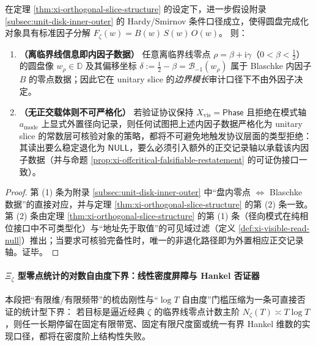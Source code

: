 \begin{corollary}[内因子数据的正交寄存器必要性]\label{cor:xi-inner-factor-orthogonal-register}
在定理 \ref{thm:xi-orthogonal-slice-structure} 的设定下，进一步假设附录 \ref{subsec:unit-disk-inner-outer} 的 Hardy/Smirnov 条件口径成立，使得圆盘完成化对象具有标准因子分解
\(
F_\zeta(w)=B(w)\,S(w)\,O(w)
\)。
则：
\begin{enumerate}
  \item \textbf{（离临界线信息即内因子数据）}
  任意离临界线零点 \(\rho=\beta+\mathrm{i}\gamma\)（\(0<\beta<\tfrac12\)）的圆盘像 \(w_\rho\in\mathbb{D}\) 及其偏移坐标
  \(
  \delta:=\tfrac12-\beta=\mathcal{B}_{-1}(w_\rho)
  \)
  属于 Blaschke 内因子 \(B\) 的零点数据；因此它在 unitary slice 的\emph{边界模长}审计口径下不由外因子决定。
  \item \textbf{（无正交载体则不可严格化）}
  若验证协议保持 \(X_{\mathrm{vis}}=\mathsf{Phase}\) 且拒绝在模式轴 \(a_{\mathrm{mode}}\) 上显式外置径向记录，则任何试图把上述内因子数据严格化为 unitary slice 的常数层可核验对象的策略，都将不可避免地触发协议层面的类型拒绝：其读出要么稳定退化为 \(\mathsf{NULL}\)，要么必须引入额外的正交记录轴以承载该内因子数据（并与命题 \ref{prop:xi-offcritical-falsifiable-restatement} 的可证伪接口一致）。
\end{enumerate}
\end{corollary}

\begin{proof}
第 (1) 条为附录 \ref{subsec:unit-disk-inner-outer} 中“盘内零点 \(\Leftrightarrow\) Blaschke 数据”的直接对应，并与定理 \ref{thm:xi-orthogonal-slice-structure} 的第 (2) 条一致。
第 (2) 条由定理 \ref{thm:xi-orthogonal-slice-structure} 的第 (1) 条（径向模式在纯相位接口中不可类型化）与“地址先于取值”的可见域过滤（定义 \ref{def:xi-visible-read-null}）推出；当要求可核验完备性时，唯一的非退化路径即为外置相应正交记录轴。证毕。
\end{proof}

\paragraph{\texorpdfstring{$\Xi_\zeta$}{Xi-zeta} 型零点统计的对数自由度下界：线性密度屏障与 Hankel 否证器}
本段把“有限维/有限频带”的梳齿刚性与“\(\log T\) 自由度”门槛压缩为一条可直接否证的统计型下界：
若目标是逼近经典 \(\zeta\) 的临界线零点计数主阶 \(N_\zeta(T)\asymp T\log T\)，则任一长期停留在固定有限带宽、固定有限尺度窗或统一有界 Hankel 维数的实现口径，都将在密度阶上结构性失败。

